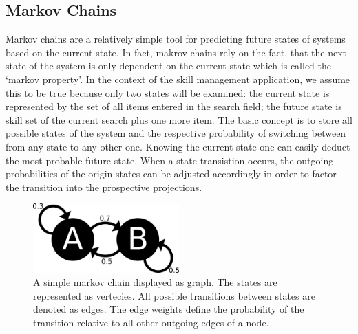 \subsection{Markov Chains}
Markov chains are a relatively simple tool for predicting future states of systems based on the current state. In fact, makrov chains rely on the fact, that the next state of the system is only dependent on the current state which is called the `markov property'. In the context of the skill management application, we assume this to be true because only two states will be examined: the current state is represented by the set of all items entered in the search field; the future state is skill set of the current search plus one more item.
The basic concept is to store all possible states of the system and the respective probability of switching between from any state to any other one.
Knowing the current state one can easily deduct the most probable future state. When a state transistion occurs, the outgoing probabilities of the origin states
can be adjusted accordingly in order to factor the transition into the prospective projections.
\begin{figure}[!htp]
    \centering
    \includegraphics[width=0.5\textwidth]{images/markov-chain.png}
    \caption[Markov Chain]{A simple markov chain displayed as graph. The states are represented as vertecies. All possible transitions between states are denoted as edges. The edge weights define the probability of the transition relative to all other outgoing edges of a node.}
    \label{fig:markovchain}
\end{figure}


